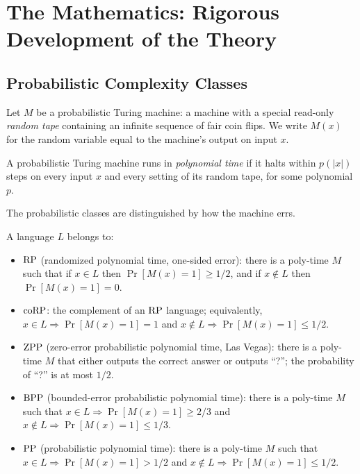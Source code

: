 \section{The Mathematics: Rigorous Development of the Theory}
\label{sec:randomized:math}

\subsection{Probabilistic Complexity Classes}
\label{sec:randomized:classes}

Let $M$ be a probabilistic Turing machine: a machine with a special read-only \emph{random tape} containing an infinite sequence of fair coin flips. We write $M(x)$ for the random variable equal to the machine's output on input $x$.

\begin{definition}
A probabilistic Turing machine runs in \emph{polynomial time} if it halts within $p(|x|)$ steps on every input $x$ and every setting of its random tape, for some polynomial $p$.
\end{definition}

The probabilistic classes are distinguished by how the machine errs.

\begin{definition}[\RP, $\coRP$, $\ZPP$, $\BPP$, $\PPclass$]
A language $L$ belongs to:
\begin{itemize}
\item $\text{RP}$ (randomized polynomial time, one-sided error): there is a poly-time $M$ such that if $x \in L$ then $\Pr[M(x)=1] \ge 1/2$, and if $x \notin L$ then $\Pr[M(x)=1] = 0$.
\item $\coRP$: the complement of an $\text{RP}$ language; equivalently, $x \in L \Rightarrow \Pr[M(x)=1] = 1$ and $x \notin L \Rightarrow \Pr[M(x)=1] \le 1/2$.
\item $\ZPP$ (zero-error probabilistic polynomial time, Las Vegas): there is a poly-time $M$ that either outputs the correct answer or outputs ``?''; the probability of ``?'' is at most $1/2$.
\item $\BPP$ (bounded-error probabilistic polynomial time): there is a poly-time $M$ such that $x \in L \Rightarrow \Pr[M(x)=1] \ge 2/3$ and $x \notin L \Rightarrow \Pr[M(x)=1] \le 1/3$.
\item $\PPclass$ (probabilistic polynomial time): there is a poly-time $M$ such that $x \in L \Rightarrow \Pr[M(x)=1] > 1/2$ and $x \notin L \Rightarrow \Pr[M(x)=1] \le 1/2$.
\end{itemize}
\end{definition}

